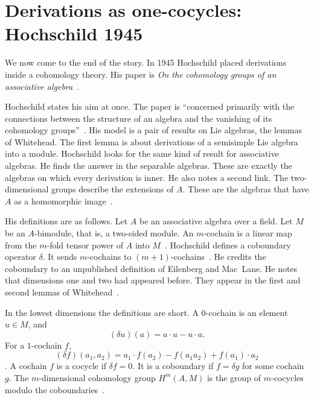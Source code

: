 \section[Derivations as one-cocycles: Hochschild 1945][Derivations as one-cocycles]{Derivations as one-cocycles: Hochschild 1945}\label{sec:origins:cohomology}

We now come to the end of the story. In 1945 Hochschild placed derivations inside a cohomology theory. His paper
is \emph{On the cohomology groups of an associative
algebra}~\cite{Hochschild1945}.

Hochschild states his aim at once. The paper is
``concerned primarily with the connections between the structure of an
algebra and the vanishing of its cohomology groups''~\cite[p.~58]{Hochschild1945}.
His model is a pair of results on Lie algebras, the lemmas of Whitehead. The
first lemma is about derivations of a semisimple Lie algebra into a module.
Hochschild looks for the same kind of result for associative algebras. He
finds the answer in the separable algebras. These are exactly the algebras
on which every derivation is inner. He also notes a second link. The
two-dimensional groups describe the extensions of $A$. These are the
algebras that have $A$ as a homomorphic image~\cite[p.~58]{Hochschild1945}.

His definitions are as follows. Let $A$ be an associative algebra over a field.
Let $M$ be an $A$-bimodule, that is, a two-sided module. An $m$-cochain is a
linear map from the $m$-fold tensor power of $A$ into
$M$~\cite[\S 1, p.~59]{Hochschild1945}. Hochschild defines a coboundary
operator $\delta$. It sends $m$-cochains to
$(m+1)$-cochains~\cite[\S 2, Definition~2.1, p.~59]{Hochschild1945}. He
credits the coboundary to an unpublished definition of Eilenberg and
Mac~Lane. He notes that dimensions one and two had appeared before. They
appear in the first and second lemmas of
Whitehead~\cite[p.~58]{Hochschild1945}.

In the lowest dimensions the definitions are short. A $0$-cochain is an
element $u \in M$, and
\[
(\delta u)(a) = a\cdot u - u\cdot a .
\]
For a $1$-cochain $f$,
\[
(\delta f)(a_1, a_2) = a_1 \cdot f(a_2) - f(a_1 a_2) + f(a_1)\cdot a_2
\]
\cite[p.~60]{Hochschild1945}. A cochain $f$ is a cocycle if $\delta f = 0$.
It is a coboundary if $f = \delta g$ for some cochain $g$. The
$m$-dimensional cohomology group $H^m(A,M)$ is the group of $m$-cocycles
modulo the coboundaries~\cite[p.~60, Definitions~2.2, 2.3]{Hochschild1945}.

